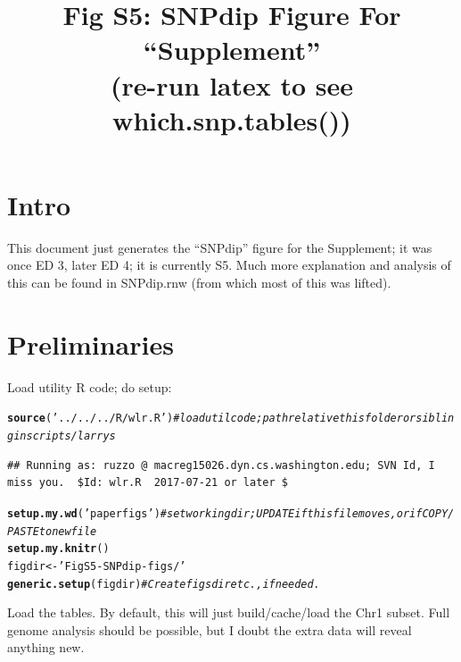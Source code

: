 \documentclass{article}\usepackage[]{graphicx}\usepackage[]{color}
\makeatletter
\newcommand{\hlstr}[1]{\textcolor[rgb]{0.192,0.494,0.8}{#1}}%
\newcommand{\hlcom}[1]{\textcolor[rgb]{0.678,0.584,0.686}{\textit{#1}}}%
\newcommand{\hlstd}[1]{\textcolor[rgb]{0.345,0.345,0.345}{#1}}%
\newcommand{\hlkwb}[1]{\textcolor[rgb]{0.69,0.353,0.396}{#1}}%
\newcommand{\hlkwd}[1]{\textcolor[rgb]{0.737,0.353,0.396}{\textbf{#1}}}%
\newenvironment{kframe}{%
 \def\at@end@of@kframe{}%
 \ifinner\ifhmode%
  \def\at@end@of@kframe{\end{minipage}}%
  \begin{minipage}{\columnwidth}%
 \fi\fi%
 \def\FrameCommand##1{\hskip\@totalleftmargin \hskip-\fboxsep
 \colorbox{shadecolor}{##1}\hskip-\fboxsep
     \hskip-\linewidth \hskip-\@totalleftmargin \hskip\columnwidth}%
 \MakeFramed {\advance\hsize-\width
   \@totalleftmargin\z@ \linewidth\hsize
   \@setminipage}}%
 {\par\unskip\endMakeFramed%
 \at@end@of@kframe}
\newenvironment{knitrout}{}{} %
\providecommand{\whichsnptables}{(re-run latex to see which.snp.tables())}
\makeatother
\begin{document}
\title{Fig S5: SNPdip Figure For ``Supplement''\\\large\whichsnptables}
\maketitle

\tableofcontents

\section{Intro}
\noindent
This document just generates the ``SNPdip'' figure for the Supplement; it was once ED 3, later ED 4;
it is currently S5. Much more explanation and analysis of this can be found in SNPdip.rnw (from
which most of this was lifted).
%
\section{Preliminaries}
%
Load utility R code; do setup:


\begin{knitrout}\footnotesize
{}\color{fgcolor}\begin{kframe}
\begin{alltt}
\hlkwd{source}\hlstd{(}\hlstr{'../../../R/wlr.R'}\hlstd{)} \hlcom{# load util code; path relative this folder or sibling in scripts/larrys }
\end{alltt}
\begin{verbatim}
## Running as: ruzzo @ macreg15026.dyn.cs.washington.edu; SVN Id, I miss you.  $Id: wlr.R  2017-07-21 or later $
\end{verbatim}
\begin{alltt}
\hlkwd{setup.my.wd}\hlstd{(}\hlstr{'paperfigs'}\hlstd{)}   \hlcom{# set working dir; UPDATE if this file moves, or if COPY/PASTE to new file}
\hlkwd{setup.my.knitr}\hlstd{()}
\hlstd{figdir} \hlkwb{<-} \hlstr{'FigS5-SNPdip-figs/'}
\hlkwd{generic.setup}\hlstd{(figdir)}            \hlcom{# Create figs dir etc., if needed.}
\end{alltt}
\end{kframe}
\end{knitrout}

Load the tables.  By default, this will just build/cache/load the Chr1 subset.  Full genome analysis 
should be possible, but I doubt the extra data will reveal anything new.
\end{document}
